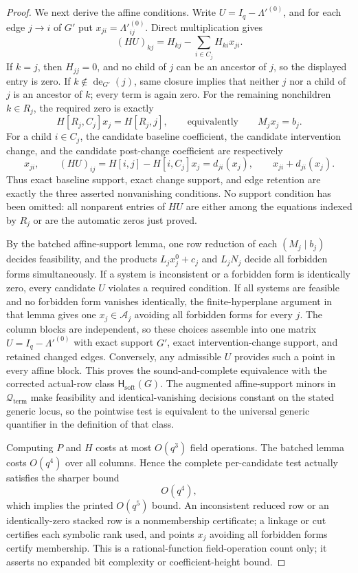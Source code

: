 \documentclass{article}
\begin{document}
\begin{proof}
We next derive the affine conditions.  Write \(U=I_q-\Lambda'^{(0)}\), and for each edge \(j\to i\) of \(G'\) put \(x_{ji}=\Lambda'^{(0)}_{ij}\).  Direct multiplication gives
\[
 (HU)_{kj}=H_{kj}-\sum_{i\in C_j}H_{ki}x_{ji}.
\]
If \(k=j\), then \(H_{jj}=0\), and no child of \(j\) can be an ancestor of \(j\), so the displayed entry is zero.  If \(k\notin\operatorname{de}_{G'}(j)\), same closure implies that neither \(j\) nor a child of \(j\) is an ancestor of \(k\); every term is again zero.  For the remaining nonchildren \(k\in R_j\), the required zero is exactly
\[
 H[R_j,C_j]x_j=H[R_j,j],
 \qquad\text{equivalently}\qquad M_jx_j=b_j.
\]
For a child \(i\in C_j\), the candidate baseline coefficient, the candidate intervention change, and the candidate post-change coefficient are respectively
\[
 x_{ji},\qquad
 (HU)_{ij}=H[i,j]-H[i,C_j]x_j=d_{ji}(x_j),\qquad
 x_{ji}+d_{ji}(x_j).
\]
Thus exact baseline support, exact change support, and edge retention are exactly the three asserted nonvanishing conditions.  No support condition has been omitted: all nonparent entries of \(HU\) are either among the equations indexed by \(R_j\) or are the automatic zeros just proved.

By the batched affine-support lemma, one row reduction of each \((M_j\mid b_j)\) decides feasibility, and the products \(L_jx_j^0+c_j\) and \(L_jN_j\) decide all forbidden forms simultaneously.  If a system is inconsistent or a forbidden form is identically zero, every candidate \(U\) violates a required condition.  If all systems are feasible and no forbidden form vanishes identically, the finite-hyperplane argument in that lemma gives one \(x_j\in\mathcal A_j\) avoiding all forbidden forms for every \(j\).  The column blocks are independent, so these choices assemble into one matrix \(U=I_q-\Lambda'^{(0)}\) with exact support \(G'\), exact intervention-change support, and retained changed edges.  Conversely, any admissible \(U\) provides such a point in every affine block.  This proves the sound-and-complete equivalence with the corrected actual-row class \(\mathsf H_{\mathrm{soft}}(G)\).  The augmented affine-support minors in \(\mathcal Q_{\mathrm{term}}\) make feasibility and identical-vanishing decisions constant on the stated generic locus, so the pointwise test is equivalent to the universal generic quantifier in the definition of that class.

Computing \(P\) and \(H\) costs at most \(O(q^3)\) field operations.  The batched lemma costs \(O(q^4)\) over all columns.  Hence the complete per-candidate test actually satisfies the sharper bound
\[
 O(q^4),
\]
which implies the printed \(O(q^5)\) bound.  An inconsistent reduced row or an identically-zero stacked row is a nonmembership certificate; a linkage or cut certifies each symbolic rank used, and points \(x_j\) avoiding all forbidden forms certify membership.  This is a rational-function field-operation count only; it asserts no expanded bit complexity or coefficient-height bound.


\end{proof}
\end{document}
